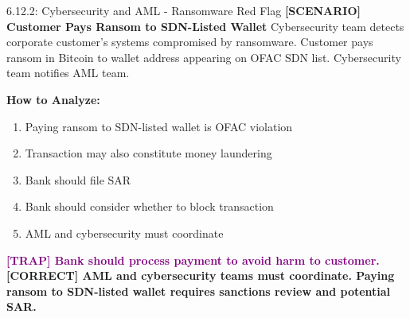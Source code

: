\documentclass[11pt,a4paper]{beamer}
\newcommand{\trap}[1]{\textcolor{purple}{\textbf{[TRAP] #1}}}
\newcommand{\correct}[1]{\textcolor{green!50!black}{\textbf{[CORRECT] #1}}}
\newcommand{\scenario}[1]{\textcolor{blue!70!black}{\textbf{[SCENARIO] #1}}}
\begin{document}
\begin{frame}{6.12.2: Cybersecurity and AML - Ransomware Red Flag}
	\scenario{Customer Pays Ransom to SDN-Listed Wallet}
	Cybersecurity team detects corporate customer's systems compromised by ransomware. Customer pays ransom in Bitcoin to wallet address appearing on OFAC SDN list. Cybersecurity team notifies AML team.
	
	\vspace{0.1cm}
	\textbf{How to Analyze:}
	\begin{enumerate}
		\item Paying ransom to SDN-listed wallet is OFAC violation
		\item Transaction may also constitute money laundering
		\item Bank should file SAR
		\item Bank should consider whether to block transaction
		\item AML and cybersecurity must coordinate
	\end{enumerate}
	\trap{Bank should process payment to avoid harm to customer.}
	\correct{AML and cybersecurity teams must coordinate. Paying ransom to SDN-listed wallet requires sanctions review and potential SAR.}
\end{frame}
\end{document}
